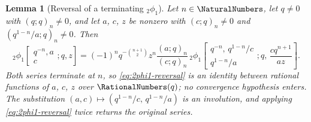 \documentclass[11pt,a4paper,oneside,openany]{book}
\newtheorem{lemma}[lemma]{Lemma}
\theoremstyle{definition}
\theoremstyle{remark}
\begin{document}
\begin{lemma}[Reversal of a terminating ${}_2\phi_1$]\label{lem:2phi1-reversal}
Let $n\in\NaturalNumbers$, let $q\ne0$ with $(q;q)_n\ne0$, and let $a$, $c$, $z$ be nonzero with
$(c;q)_n\ne0$ and $(q^{1-n}/a;q)_n\ne0$.  Then
\begin{equation}
 {}_2\phi_1\!\left[
 \begin{matrix}q^{-n},a\\c\end{matrix};q,z\right]
 =(-1)^nq^{-\binom{n+1}{2}}z^{n}\frac{(a;q)_n}{(c;q)_n}\,
 {}_2\phi_1\!\left[
 \begin{matrix}q^{-n},\,q^{1-n}/c\\[2pt] q^{1-n}/a\end{matrix};q,
 \,\frac{cq^{n+1}}{az}\right].
 \label{eq:2phi1-reversal}
\end{equation}
Both series terminate at $n$, so \eqref{eq:2phi1-reversal} is an identity between rational functions of $a$, $c$, $z$ over $\RationalNumbers(q)$; no convergence hypothesis enters.  The substitution $(a,c)\mapsto(q^{1-n}/c,\,q^{1-n}/a)$ is an involution, and applying \eqref{eq:2phi1-reversal} twice returns the original series.
\end{lemma}
\end{document}
